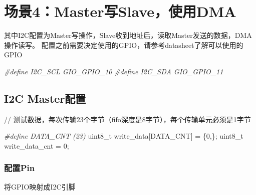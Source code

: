 \documentclass[
  12pt,
]{book}
\newenvironment{Shaded}{\begin{snugshade}}{\end{snugshade}}
\newcommand{\DataTypeTok}[1]{\textcolor[rgb]{0.13,0.29,0.53}{#1}}
\newcommand{\DecValTok}[1]{\textcolor[rgb]{0.00,0.00,0.81}{#1}}
\newcommand{\NormalTok}[1]{#1}
\newcommand{\PreprocessorTok}[1]{\textcolor[rgb]{0.56,0.35,0.01}{\textit{#1}}}
\begin{document}
\hypertarget{ux573aux666f4masterux5199slaveux4f7fux7528dma}{%
\section{场景4：Master写Slave，使用DMA}\label{ux573aux666f4masterux5199slaveux4f7fux7528dma}}

其中I2C配置为Master写操作，Slave收到地址后，读取Master发送的数据，DMA操作读写。 配置之前需要决定使用的GPIO，请参考datasheet了解可以使用的GPIO

\begin{Shaded}
\begin{Highlighting}[]
\PreprocessorTok{#define I2C_SCL         GIO_GPIO_10}
\PreprocessorTok{#define I2C_SDA         GIO_GPIO_11}
\end{Highlighting}
\end{Shaded}

\hypertarget{i2c-masterux914dux7f6e-3}{%
\subsection{I2C Master配置}\label{i2c-masterux914dux7f6e-3}}

// 测试数据，每次传输23个字节（fifo深度是8字节），每个传输单元必须是1字节

\begin{Shaded}
\begin{Highlighting}[]
\PreprocessorTok{#define DATA_CNT (23)}
\DataTypeTok{uint8_t}\NormalTok{ write_data[DATA_CNT] = \{}\DecValTok{0}\NormalTok{,\};}
\DataTypeTok{uint8_t}\NormalTok{ write_data_cnt = }\DecValTok{0}\NormalTok{;}
\end{Highlighting}
\end{Shaded}

\hypertarget{ux914dux7f6epin-6}{%
\subsubsection{配置Pin}\label{ux914dux7f6epin-6}}

将GPIO映射成I2C引脚
\end{document}

